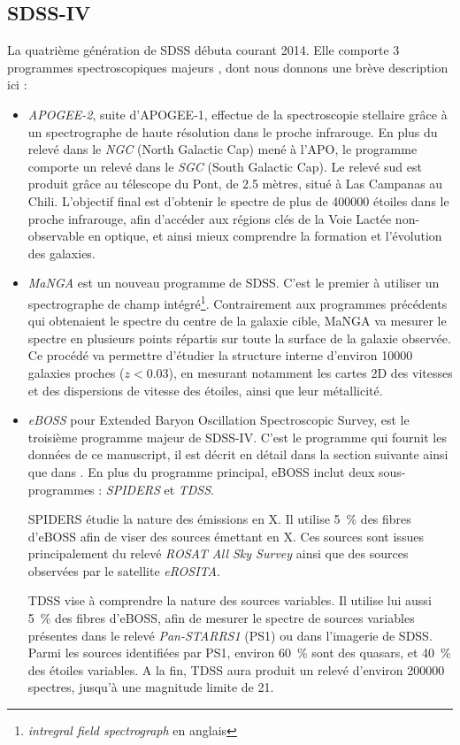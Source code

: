 \documentclass[11pt, twoside, a4paper, openright]{report}
\begin{document}
\subsection{SDSS-IV}

La quatrième génération de SDSS débuta courant 2014. Elle comporte 3 programmes spectroscopiques majeurs \autocite{Blanton2017}, dont nous donnons une brève description ici :
\begin{itemize}
\item \emph{APOGEE-2}, suite d'APOGEE-1, effectue de la spectroscopie stellaire grâce à un spectrographe de haute résolution dans le proche infrarouge. En plus du relevé dans le \emph{NGC} (North Galactic Cap) mené à l'APO, le programme comporte un relevé dans le \emph{SGC} (South Galactic Cap). Le relevé sud est produit grâce au télescope du Pont, de \num{2,5} mètres, situé à Las Campanas au Chili. L'objectif final est d'obtenir le spectre de plus de \num{400000} étoiles dans le proche infrarouge, afin d'accéder aux régions clés de la Voie Lactée non-observable en optique, et ainsi mieux comprendre la formation et l'évolution des galaxies.
\item \emph{MaNGA} est un nouveau programme de SDSS. C'est le premier à utiliser un spectrographe de champ intégré\footnote{\emph{intregral field spectrograph} en anglais}. Contrairement aux programmes précédents qui obtenaient le spectre du centre de la galaxie cible, MaNGA va mesurer le spectre en plusieurs points répartis sur toute la surface de la galaxie observée. Ce procédé va permettre d'étudier la structure interne d'environ \num{10000} galaxies proches ($z < \num{0,03}$), en mesurant notamment les cartes 2D des vitesses et des dispersions de vitesse des étoiles, ainsi que leur  métallicité.
\item \emph{eBOSS} pour Extended Baryon Oscillation Spectroscopic Survey, est le troisième programme majeur de SDSS-IV. C'est le programme qui fournit les données de ce manuscript, il est décrit en détail dans la section suivante ainsi que dans \textcite{Dawson2015}. En plus du programme principal, eBOSS inclut deux sous-programmes : \emph{SPIDERS} et \emph{TDSS}.
  
  SPIDERS étudie la nature des émissions en X. Il utilise \SI{5}{\percent} des fibres d'eBOSS afin de viser des sources émettant en X. Ces sources sont issues principalement du relevé \emph{ROSAT All Sky Survey} ainsi que des sources observées par le satellite \emph{eROSITA}.

  TDSS vise à comprendre la nature des sources variables. Il utilise lui aussi \SI{5}{\percent} des fibres d'eBOSS, afin de mesurer le spectre de sources variables présentes dans le relevé \emph{Pan-STARRS1} (PS1) ou dans l'imagerie de SDSS. Parmi les sources identifiées par PS1, environ \SI{60}{\percent} sont des quasars, et \SI{40}{\percent} des étoiles variables. A la fin, TDSS aura produit un relevé d'environ \num{200000} spectres, jusqu'à une magnitude limite de 21.
\end{itemize}
\end{document}
